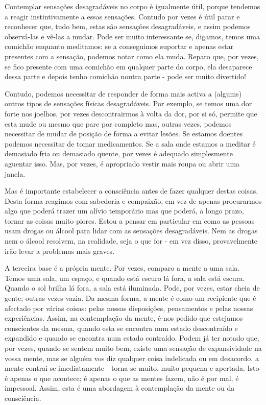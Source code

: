 Contemplar sensações desagradáveis no corpo é igualmente útil, porque
tendemos a reagir instintivamente a essas sensações. Contudo por vezes é
útil parar e reconhecer que, tudo bem, estas são sensações
desagradáveis, e assim podemos observá-las e \mbox{vê-las} a mudar. Pode ser
muito interessante se, digamos, temos uma comichão enquanto meditamos:
se a conseguimos suportar e apenas estar presentes com a sensação,
podemos notar como ela muda. Reparo que, por vezes, se fico presente com
uma comichão em qualquer parte do corpo, ela desaparece dessa parte e
depois tenho comichão noutra parte - pode ser muito divertido!

Contudo, podemos necessitar de responder de forma mais activa a (algums)
outros tipos de sensações físicas desagradáveis. Por exemplo, se temos
uma dor forte nos joelhos, por vezes descontrairmos à volta da dor, por
si só, permite que esta mude ou mesmo que pare por completo mas, outras
vezes, podemos necessitar de mudar de posição de forma a evitar lesões.
Se estamos doentes podemos necessitar de tomar medicamentos. Se a sala
onde estamos a meditar é demasiado fria ou demasiado quente, por vezes é
adequado simplesmente aguentar isso. Mas, por vezes, é apropriado vestir
mais roupa ou abrir uma janela.

Mas é importante estabelecer a consciência antes de fazer qualquer
destas coisas. Desta forma reagimos com sabedoria e compaixão, em vez de
apenas procurarmos algo que poderá trazer um alívio temporário mas que
poderá, a longo prazo, tornar as coisas muito piores. Estou a pensar em
particular em como as pessoas usam drogas ou álcool para lidar com as
sensações desagradáveis. Nem as drogas nem o álcool resolvem, na
realidade, seja o que for - em vez disso, provavelmente irão levar a
problemas mais graves.

A terceira base é a própria mente. Por vezes, comparo a mente a uma
sala. Temos uma sala, um espaço, e quando está escuro lá fora, a sala
está escura. Quando o sol brilha lá fora, a sala está iluminada. Pode,
por vezes, estar cheia de gente; outras vezes vazia. Da mesma forma, a
mente é como um recipiente que é afectado por várias coisas: pelas
nossas disposições, pensamentos e pelas nossas experiências. Assim, na
contemplação da mente, é-nos pedido que estejamos conscientes da mesma,
quando esta se encontra num estado descontraído e expandido e quando se
encontra num estado contraído. Podem já ter notado que, por vezes,
quando se sentem muito bem, existe uma sensação de expansividade na
vossa mente, mas se alguém vos diz qualquer coisa indelicada ou em
desacordo, a mente contrai-se imediatamente - torna-se muito, muito
pequena e apertada. Isto é apenas o que acontece; é apenas o que as
mentes fazem, não é por mal, é impessoal. Assim, esta é uma abordagem à
contemplação da mente ou da consciência.

